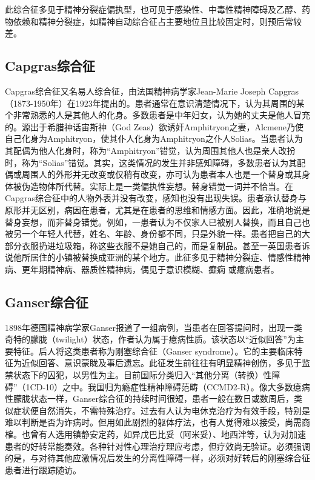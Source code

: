 此综合征多见于精神分裂症偏执型，也可见于感染性、中毒性精神障碍及乙醇、药物依赖和精神分裂症，如精神自动综合征占主要地位且比较固定时，则预后常较差。

\subsection{Capgras综合征}

Capgras综合征又名易人综合征，由法国精神病学家Jean-Marie Joseph
Capgras（1873-1950年）在1923年提出的。患者通常在意识清楚情况下，认为其周围的某个非常熟悉的人是其他人的化身。多数患者是中年妇女，认为她的丈夫是他人冒充的。源出于希腊神话宙斯神（God
Zeas）欲诱奸Amphitryon之妻，Alcmene乃使自己化身为Amphitryon，使其仆人化身为Amphitryon之仆人Solias。当患者认为其配偶为他人化身时，称为“Amphitryon”错觉，认为周围其他人也是亲人改扮时，称为“Solias”错觉。其实，这类情况的发生并非感知障碍，多数患者认为其配偶或周围人的外形并无改变或仅稍有改变，亦可认为患者本人也是一个替身或其身体被伪造物体所代替。实际上是一类偏执性妄想。替身错觉一词并不恰当。在Capgras综合征中的人物外表并没有改变，感知也没有出现失误。患者承认替身与原形并无区别，病因在患者，尤其是在患者的思维和情感方面。因此，准确地说是替身妄想，而非替身错觉。例如，一患者认为不仅家人已被别人替换，而且自己也被另一个年轻人代替，姓名、年龄、身份都不同，只是外貌一样。患者把自己的大部分衣服扔进垃圾箱，称这些衣服不是她自己的，而是复制品。甚至一英国患者诉说他所居住的小镇被替换成亚洲的某个地方。此征多见于精神分裂症、情感性精神病、更年期精神病、器质性精神病，偶见于意识模糊、癫痫
或癔病患者。

\subsection{Ganser综合征}

1898年德国精神病学家Ganser报道了一组病例，当患者在回答提问时，出现一类奇特的朦胧（twilight）状态，作者认为属于癔病性质。该状态以“近似回答”为主要特征。后人将这类患者称为刚塞综合征（Ganser
syndrome）。它的主要临床特征为近似回答、意识蒙眬及事后遗忘。此征发生前往往有明显精神创伤，多见于监禁状态下的囚犯，以男性为主。目前国际分类归入“其他分离（转换）性障碍”（1CD-10）之中。我国归为瘾症性精神障碍范畴（CCMD2-R）。像大多数癔病性朦胧状态一样，Ganser综合征的持续时间很短，患者一般在数日或数周后，类似症状便自然消失，不需特殊治疗。过去有人认为电休克治疗为有效手段，特别是难以判断是否为诈病时。但用如此剧烈的躯体疗法，也有人觉得难以接受，尚需商榷。也曾有人选用镇静安定药，如异戊巴比妥（阿米妥）、地西泮等，认为对加速患者的好转常能奏效。各种针对性心理治疗理应考虑，但疗效尚无验证。必须强调的是，与对待其他应激情况后发生的分离性障碍一样，必须对好转后的刚塞综合征患者进行跟踪随访。

